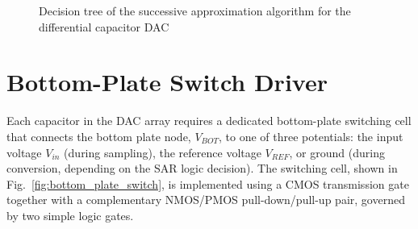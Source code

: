 \begin{figure}[h]
{
	}
	\caption{Decision tree of the successive approximation algorithm for the differential capacitor DAC}
	\label{fig:dac_array4}
\end{figure}


\section{Bottom-Plate Switch Driver}

Each capacitor in the DAC array requires a dedicated bottom-plate switching
cell that connects the bottom plate node, $V_{BOT}$, to one of three
potentials: the input voltage $V_{in}$ (during sampling), the reference
voltage $V_{REF}$, or ground (during conversion, depending on the SAR logic
decision). The switching cell, shown in Fig.~\ref{fig:bottom_plate_switch},
is implemented using a CMOS transmission gate together with a
complementary NMOS/PMOS pull-down/pull-up pair, governed by two simple logic
gates.

